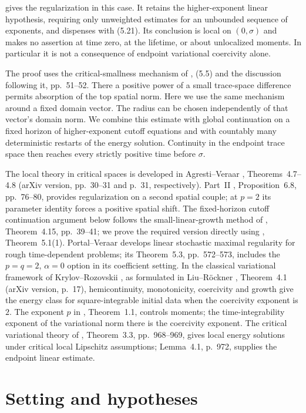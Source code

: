 \documentclass[11pt]{amsart}
\theoremstyle{definition}
\theoremstyle{remark}
\numberwithin{equation}{section}
\begin{document}
 gives the regularization in this case. It retains the
higher-exponent linear hypothesis, requiring only unweighted estimates for
an unbounded sequence of exponents, and dispenses with (5.21).
Its conclusion is local on $(0,\sigma)$ and makes no assertion at time zero,
at the lifetime, or about unlocalized moments. In particular it is not a
consequence of endpoint variational coercivity alone.

The proof uses the critical-smallness mechanism of \cite{Survey}, (5.5) and
the discussion following it, pp.~51--52. There a positive power of a small
trace-space difference permits absorption of the top spatial norm.
Here we use the same mechanism around a fixed domain vector. The radius
can be chosen independently of that vector's domain norm. We combine this
estimate with global continuation on a fixed horizon of higher-exponent
cutoff equations and with countably many deterministic restarts of the
energy solution. Continuity in the endpoint trace space then reaches every
strictly positive time before $\sigma$.

The local theory in critical spaces is developed in Agresti--Veraar
\cite{AVI}, Theorems~4.7--4.8 (arXiv version, pp.~30--31 and p.~31,
respectively). Part~II \cite{AVII}, Proposition~6.8, pp.~76--80, provides
regularization on a second spatial couple; at $p=2$ its parameter identity
forces a positive spatial shift. The fixed-horizon cutoff continuation
argument below follows the small-linear-growth method of \cite{AVII},
Theorem~4.15, pp.~39--41; we prove the required version directly using
\cite{Survey}, Theorem~5.1(1). Portal--Veraar
\cite{PV} develops linear stochastic maximal regularity for rough
time-dependent problems; its Theorem~5.3, pp.~572--573, includes the
$p=q=2$, $\alpha=0$ option in its coefficient setting.
In the classical variational framework of Krylov--Rozovskii \cite{KR},
as formulated in Liu--R\"ockner \cite{LR}, Theorem~4.1 (arXiv version,
p.~17), hemicontinuity, monotonicity, coercivity and growth give the
energy class for square-integrable initial data when the coercivity
exponent is $2$. The exponent $p$ in \cite{LR}, Theorem~1.1, controls
moments; the time-integrability exponent of the variational norm there
is the coercivity exponent.
The critical variational theory of \cite{CV}, Theorem~3.3, pp.~968--969,
gives local energy solutions under critical local Lipschitz assumptions;
Lemma~4.1, p.~972, supplies the endpoint linear estimate.

\section{Setting and hypotheses}\label{sec:setting}
\end{document}
